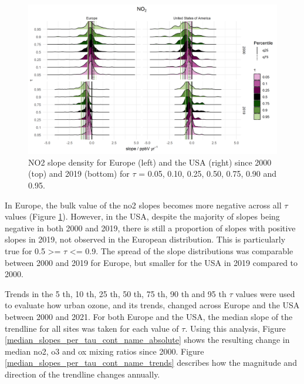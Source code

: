 \documentclass[journal abbreviation, manuscript]{copernicus}
\begin{document}
\begin{figure}[h!]
\includegraphics[width=12cm]{plots/no2_density_ridges_by_tau_continent_2000_2019.png}
\caption{NO2 slope density for Europe (left) and the USA (right) since 2000 (top) and 2019 (bottom) for $\tau$ = 0.05, 0.10, 0.25, 0.50, 0.75, 0.90 and 0.95.}
\label{no2_ridge_plot}
\end{figure}

In Europe, the bulk value of the no2 slopes becomes more negative across all $\tau$ values (Figure \ref{no2_ridge_plot}). However, in the USA, despite the majority of slopes being negative in both 2000 and 2019, there is still a proportion of slopes with positive slopes in 2019, not observed in the European distribution. This is particularly true for 0.5 >= $\tau$ <= 0.9. The spread of the slope distributions was comparable between 2000 and 2019 for Europe, but smaller for the USA in 2019 compared to 2000.

Trends in the 5 th, 10 th, 25 th, 50 th, 75 th, 90 th and 95 th $\tau$ values were used to evaluate how urban ozone, and its trends, changed across Europe and the USA between 2000 and 2021. For both Europe and the USA, the median slope of the trendline for all sites was taken for each value of  $\tau$. Using this analysis, Figure \ref{median_slopes_per_tau_cont_name_absolute} shows the resulting change in median no2, o3 and ox mixing ratios since 2000. Figure \ref{median_slopes_per_tau_cont_name_trends} describes how the magnitude and direction of the trendline changes annually.
\end{document}
